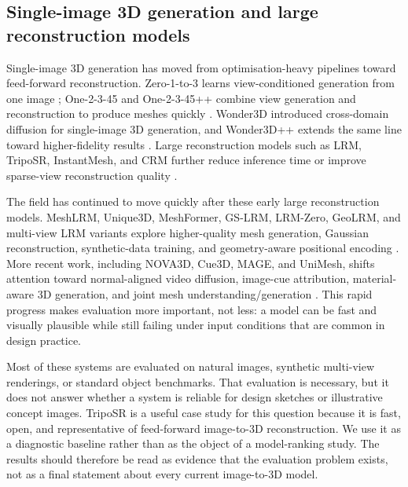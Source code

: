 \documentclass[12pt,a4paper]{article}
\begin{document}
\subsection{Single-image 3D generation and large reconstruction models}

Single-image 3D generation has moved from optimisation-heavy pipelines toward feed-forward reconstruction. Zero-1-to-3 learns view-conditioned generation from one image \parencite{liu2023zero123}; One-2-3-45 and One-2-3-45++ combine view generation and reconstruction to produce meshes quickly \parencite{liu2023one2345,liu2023one2345pp}. Wonder3D introduced cross-domain diffusion for single-image 3D generation, and Wonder3D++ extends the same line toward higher-fidelity results \parencite{long2023wonder3d,long2025wonder3dpp}. Large reconstruction models such as LRM, TripoSR, InstantMesh, and CRM further reduce inference time or improve sparse-view reconstruction quality \parencite{hong2023lrm,tochilkin2024triposr,xu2024instantmesh,wang2024crm}.

The field has continued to move quickly after these early large reconstruction models. MeshLRM, Unique3D, MeshFormer, GS-LRM, LRM-Zero, GeoLRM, and multi-view LRM variants explore higher-quality mesh generation, Gaussian reconstruction, synthetic-data training, and geometry-aware positional encoding \parencite{wei2024meshlrm,wu2024unique3d,liu2024meshformer,zhang2024gslrm,xie2024lrmzero,zhang2024geolrm,li2024mvlrm}. More recent work, including NOVA3D, Cue3D, MAGE, and UniMesh, shifts attention toward normal-aligned video diffusion, image-cue attribution, material-aware 3D generation, and joint mesh understanding/generation \parencite{yang2025nova3d,li2025cue3d,wang2025mage,huang2026unimesh}. This rapid progress makes evaluation more important, not less: a model can be fast and visually plausible while still failing under input conditions that are common in design practice.

Most of these systems are evaluated on natural images, synthetic multi-view renderings, or standard object benchmarks. That evaluation is necessary, but it does not answer whether a system is reliable for design sketches or illustrative concept images. TripoSR is a useful case study for this question because it is fast, open, and representative of feed-forward image-to-3D reconstruction. We use it as a diagnostic baseline rather than as the object of a model-ranking study. The results should therefore be read as evidence that the evaluation problem exists, not as a final statement about every current image-to-3D model.
\end{document}
